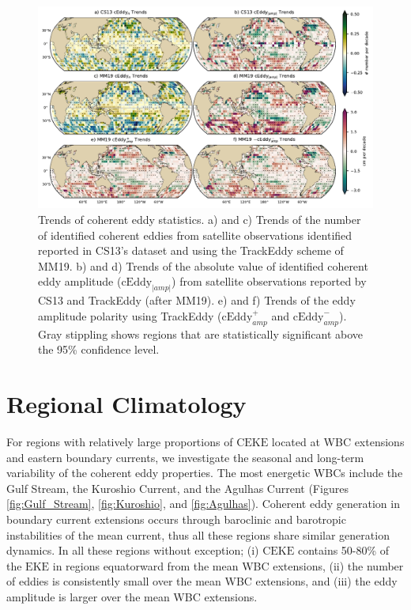 \documentclass[draft,linenumbers]{agujournal2019}
\newcommand{\EKE}{\textrm{EKE}}
\newcommand{\CEKE}{\textrm{CEKE}}
\newcommand{\cEddy}{\textrm{cEddy}}
\begin{document}
	\begin{figure}
	    \centering
	    \includegraphics[width=1\textwidth]{./figures/all_trackeddy_trends_all_regular.pdf}
	    \caption{Trends of coherent eddy statistics. a) and c) Trends of the number of identified coherent eddies from satellite observations identified reported in CS13's dataset and using the TrackEddy scheme of MM19. b) and d) Trends of the absolute value of identified coherent eddy amplitude ($\cEddy_{|amp|}$) from satellite observations reported by CS13 and TrackEddy (after MM19). e) and f) Trends of the eddy amplitude polarity using TrackEddy ($\cEddy_{amp}^+$ and $\cEddy_{amp}^-$). Gray stippling shows regions that are statistically significant above the 95\% confidence level.}
	    \label{fig:eddy_stats_trends}
	\end{figure}


	\section{Regional Climatology}
	\label{sec:CE_regional_stats}
	
	For regions with relatively large proportions of $\CEKE$ located at WBC extensions and eastern boundary currents, we investigate the seasonal and long-term variability of the coherent eddy properties. The most energetic WBCs include the Gulf Stream, the Kuroshio Current, and the Agulhas Current (Figures \ref{fig:Gulf_Stream}, \ref{fig:Kuroshio}, and \ref{fig:Agulhas}). 
	Coherent eddy generation in boundary current extensions occurs through baroclinic and barotropic instabilities of the mean current, thus all these regions share similar generation dynamics. 
	In all these regions without exception; (i) $\CEKE$ contains 50-80\% of the $\EKE$ in regions equatorward from the mean WBC extensions, (ii) the number of eddies is consistently small over the mean WBC extensions, and (iii) the eddy amplitude is larger over the mean WBC extensions. 
\end{document}
